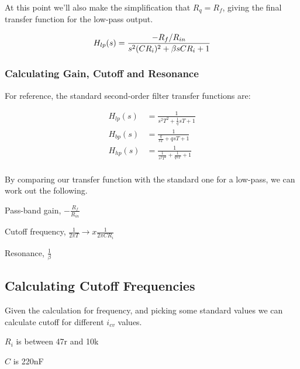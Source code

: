 \documentclass{article}
\begin{document}
At this point we'll also make the simplification that $R_q = R_{f}$, giving the final transfer function for the low-pass output.

\begin{equation}
  H_{lp}(s) = \frac{-R_{f}/R_{in}}{s^2(CR_{i})^2 + \beta sCR_{i} + 1 } \\
\end{equation}

\subsubsection{Calculating Gain, Cutoff and Resonance}

For reference, the standard second-order filter transfer functions are:

\begin{equation*}
\begin{split}
  H_{lp}(s) & = \frac{1}{s^2T^2 + \frac{1}{q}sT + 1} \\
  H_{bp}(s) & = \frac{1}{\frac{q}{sT} + qsT + 1} \\
  H_{hp}(s) & = \frac{1}{\frac{1}{s^2T^2} + \frac{1}{qsT} + 1} \\
\end{split}
\end{equation*}

By comparing our transfer function with the standard one for a low-pass, we can work out the following.

\begin{description}
  \item Pass-band gain, $-\frac{R_{f}}{R_{in}}$
  \item Cutoff frequency, $\frac{1}{2{\pi}T} \rightarrow x\frac{1}{2{\pi}CR_{i}}$
  \item Resonance, $\frac{1}{\beta}$
\end{description}

\subsection{Calculating Cutoff Frequencies}

Given the calculation for frequency, and picking some standard values we can calculate cutoff for different $i_{cv}$ values.

\begin{description}
  \item $R_i$ is between 47r and 10k
  \item $C$ is 220nF
\end{description}
\end{document}
